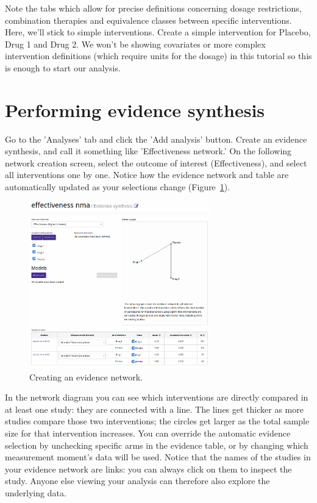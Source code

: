 \documentclass[12pt]{article}
\begin{document}
Note the tabs which allow for precise definitions concerning dosage restrictions, combination therapies and equivalence classes between specific interventions.
Here, we'll stick to simple interventions.
Create a simple intervention for Placebo, Drug 1 and Drug 2.
We won't be showing covariates or more complex intervention definitions (which require units for the dosage) in this tutorial so this is enough to start our analysis.

\section{Performing evidence synthesis}

Go to the 'Analyses' tab and click the 'Add analysis' button.
Create an evidence synthesis, and call it something like 'Effectiveness network.'
On the following network creation screen, select the outcome of interest (Effectiveness), and select all interventions one by one.
Notice how the evidence network and table are automatically updated as your selections change  (Figure~\ref{fig:createNetwork}).

\begin{figure}[!ht]
  \centering
  \includegraphics[width=0.7\textwidth]{img/createNetwork.png}
  \caption{Creating an evidence network.}
\label{fig:createNetwork}
\end{figure}

In the network diagram you can see which interventions are directly compared in at least one study: they are connected with a line.
The lines get thicker as more studies compare those two interventions; the circles get larger as the total sample size for that intervention increases.
You can override the automatic evidence selection by unchecking specific arms in the evidence table, or by changing which measurement moment's data will be used.
Notice that the names of the studies in your evidence network are links: you can always click on them to inspect the study.
Anyone else viewing your analysis can therefore also explore the underlying data.
\end{document}
